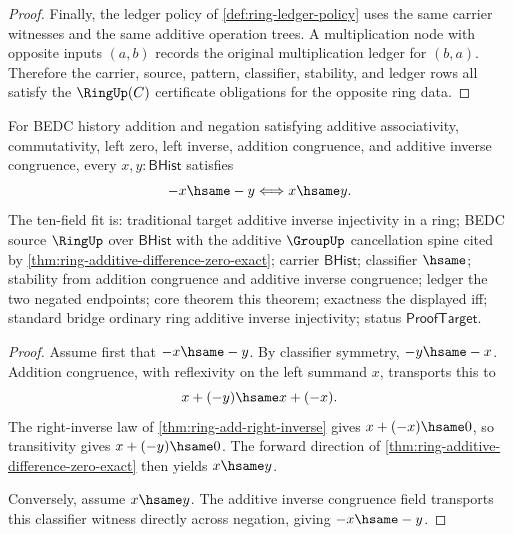 \begin{proof}
Finally, the ledger policy of \autoref{def:ring-ledger-policy} uses the same
carrier witnesses and the same additive operation trees. A multiplication node
with opposite inputs $(a,b)$ records the original multiplication ledger for
$(b,a)$. Therefore the carrier, source, pattern, classifier, stability, and
ledger rows all satisfy the $\RingUp(C)$ certificate obligations for the
opposite ring data.
\end{proof}

\begin{theorem}
\label{thm:ring-negation-classifier-exactness}
For BEDC history addition and negation satisfying additive associativity,
commutativity, left zero, left inverse, addition congruence, and additive
inverse congruence, every $x,y:\mathsf{BHist}$ satisfies
$$
-x\hsame -y \Longleftrightarrow x\hsame y.
$$
The ten-field fit is: traditional target additive inverse injectivity in a
ring; BEDC source $\RingUp$ over $\mathsf{BHist}$ with the additive
$\GroupUp$ cancellation spine cited by
\autoref{thm:ring-additive-difference-zero-exact}; carrier $\mathsf{BHist}$;
classifier $\hsame$; stability from addition congruence and additive inverse
congruence; ledger the two negated endpoints; core theorem this theorem;
exactness the displayed iff; standard bridge ordinary ring additive inverse
injectivity; status $\mathsf{ProofTarget}$.
\end{theorem}
\begin{proof}
Assume first that $-x\hsame -y$. By classifier symmetry, $-y\hsame -x$.
Addition congruence, with reflexivity on the left summand $x$, transports this
to
$$
x+(-y)\hsame x+(-x).
$$
The right-inverse law of \autoref{thm:ring-add-right-inverse} gives
$x+(-x)\hsame0$, so transitivity gives $x+(-y)\hsame0$. The forward direction
of \autoref{thm:ring-additive-difference-zero-exact} then yields
$x\hsame y$.

Conversely, assume $x\hsame y$. The additive inverse congruence field
transports this classifier witness directly across negation, giving
$-x\hsame -y$.
\end{proof}

